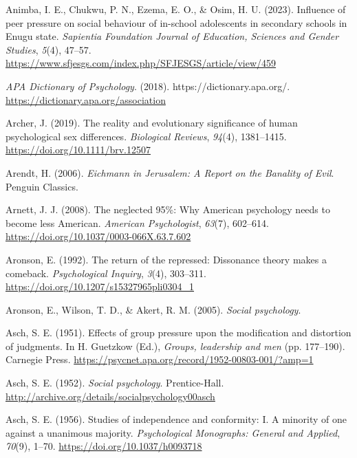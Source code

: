 \documentclass[
  letterpaper,
]{book}
\newlength{\cslhangindent}
\newenvironment{CSLReferences}[2] %
 {\begin{list}{}{%
  \setlength{\itemindent}{0pt}
  \setlength{\leftmargin}{0pt}
  \setlength{\parsep}{0pt}
  \ifodd #1
   \setlength{\leftmargin}{\cslhangindent}
   \setlength{\itemindent}{-1\cslhangindent}
  \fi
  \setlength{\itemsep}{#2\baselineskip}}}
 {\end{list}}
\begin{document}
\begin{CSLReferences}{1}{0}
Animba, I. E., Chukwu, P. N., Ezema, E. O., \& Osim, H. U. (2023).
Influence of peer pressure on social behaviour of in-school adolescents
in secondary schools in {Enugu} state. \emph{Sapientia Foundation
Journal of Education, Sciences and Gender Studies}, \emph{5}(4), 47--57.
\url{https://www.sfjesgs.com/index.php/SFJESGS/article/view/459}

\emph{{APA Dictionary} of {Psychology}}. (2018).
https://dictionary.apa.org/.
\url{https://dictionary.apa.org/association}

Archer, J. (2019). The reality and evolutionary significance of human
psychological sex differences. \emph{Biological Reviews}, \emph{94}(4),
1381--1415. \url{https://doi.org/10.1111/brv.12507}

Arendt, H. (2006). \emph{Eichmann in {Jerusalem}: {A} {Report} on the
{Banality} of {Evil}}. Penguin Classics.

Arnett, J. J. (2008). The neglected 95\%: {Why} {American} psychology
needs to become less {American}. \emph{American Psychologist},
\emph{63}(7), 602--614. \url{https://doi.org/10.1037/0003-066X.63.7.602}

Aronson, E. (1992). The return of the repressed: Dissonance theory makes
a comeback. \emph{Psychological Inquiry}, \emph{3}(4), 303--311.
\url{https://doi.org/10.1207/s15327965pli0304_1}

Aronson, E., Wilson, T. D., \& Akert, R. M. (2005). \emph{Social
psychology}.

Asch, S. E. (1951). Effects of group pressure upon the modification and
distortion of judgments. In H. Guetzkow (Ed.), \emph{Groups, leadership
and men} (pp. 177--190). Carnegie Press.
\url{https://psycnet.apa.org/record/1952-00803-001/?amp=1}

Asch, S. E. (1952). \emph{Social psychology}. Prentice-Hall.
\url{http://archive.org/details/socialpsychology00asch}

Asch, S. E. (1956). Studies of independence and conformity: {I}. {A}
minority of one against a unanimous majority. \emph{Psychological
Monographs: General and Applied}, \emph{70}(9), 1--70.
\url{https://doi.org/10.1037/h0093718}


\end{CSLReferences}
\end{document}
